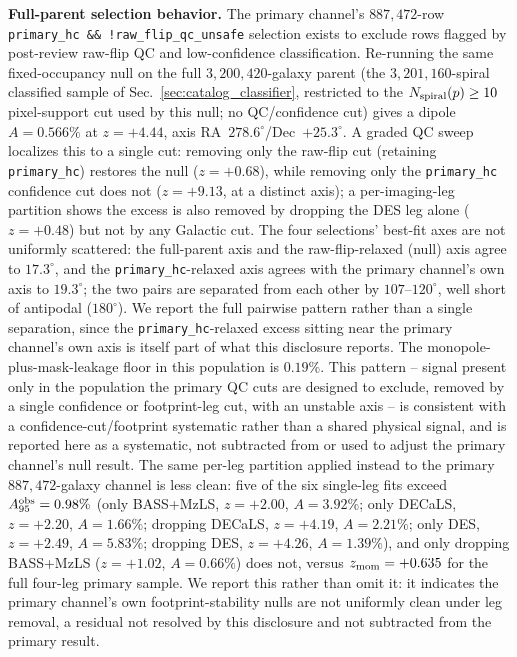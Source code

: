 \documentclass[twocolumn,linenumbers]{aastex702}
\begin{document}
\textbf{Full-parent selection behavior.} The primary channel's
$887{,}472$-row \texttt{primary\_hc \&\& !raw\_flip\_qc\_unsafe} selection
exists to exclude rows flagged by post-review raw-flip QC and
low-confidence classification. Re-running the same fixed-occupancy null on
the full $3{,}200{,}420$-galaxy parent (the $3{,}201{,}160$-spiral
classified sample of Sec.~\ref{sec:catalog_classifier}, restricted to the
$N_{\rm spiral}(p)\geq10$ pixel-support cut used by this null; no
QC/confidence cut) gives a
dipole $A=0.566\%$ at $z=+4.44$, axis RA~$278.6^\circ$/Dec~$+25.3^\circ$. A
graded QC sweep localizes this to a single cut: removing only the raw-flip
cut (retaining \texttt{primary\_hc}) restores the null ($z=+0.68$), while
removing only the \texttt{primary\_hc} confidence cut does not ($z=+9.13$,
at a distinct axis); a per-imaging-leg partition shows the excess is also
removed by dropping the DES leg alone ($z=+0.48$) but not by any Galactic
cut. The four selections' best-fit axes are not uniformly scattered: the
full-parent axis and the raw-flip-relaxed (null) axis agree to
$17.3^\circ$, and the \texttt{primary\_hc}-relaxed axis agrees with the
primary channel's own axis to $19.3^\circ$; the two pairs are separated
from each other by $107$--$120^\circ$, well short of antipodal
($180^\circ$). We report the full pairwise pattern rather than a single
separation, since the \texttt{primary\_hc}-relaxed excess sitting near the
primary channel's own axis is itself part of what this disclosure reports.
The monopole-plus-mask-leakage floor in this
population is $0.19\%$. This pattern -- signal present only in the
population the primary QC cuts are designed to exclude, removed by a
single confidence or footprint-leg cut, with an unstable axis -- is
consistent with a confidence-cut/footprint systematic rather than a shared
physical signal, and is reported here as a systematic, not subtracted from
or used to adjust the primary channel's null result. The same per-leg
partition applied instead to the primary $887{,}472$-galaxy channel is
less clean: five of the six single-leg fits exceed $A_{95}^{\rm obs}=0.98\%$
(only BASS+MzLS, $z=+2.00$, $A=3.92\%$; only DECaLS, $z=+2.20$, $A=1.66\%$;
dropping DECaLS, $z=+4.19$, $A=2.21\%$; only DES, $z=+2.49$, $A=5.83\%$;
dropping DES, $z=+4.26$, $A=1.39\%$), and only dropping BASS+MzLS
($z=+1.02$, $A=0.66\%$) does not, versus $z_{\rm mom}=+0.635$
for the full four-leg primary sample. We report this rather than omit it:
it indicates the primary channel's own footprint-stability nulls are not
uniformly clean under leg removal, a residual not resolved by this
disclosure and not subtracted from the primary result.
\end{document}

